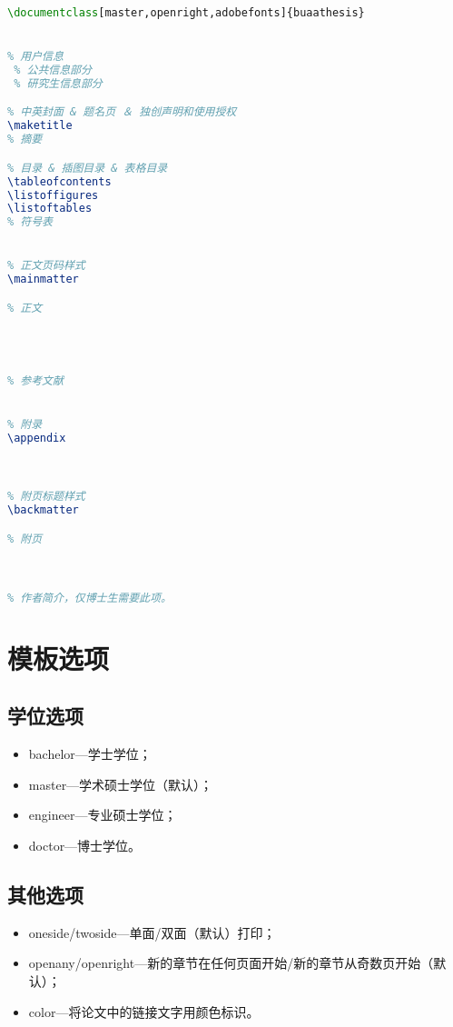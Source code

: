 \begin{lstlisting}[language={LaTeX}]
% !Mode:: "TeX:UTF-8"
\documentclass[master,openright,adobefonts]{buaathesis}


% 用户信息
 % 公共信息部分
 % 研究生信息部分

% 中英封面 & 题名页 ＆ 独创声明和使用授权
\maketitle
% 摘要

% 目录 & 插图目录 & 表格目录
\tableofcontents
\listoffigures
\listoftables
% 符号表


% 正文页码样式
\mainmatter

% 正文
	



% 参考文献


% 附录
\appendix



% 附页标题样式
\backmatter

% 附页



% 作者简介，仅博士生需要此项。


\end{lstlisting}
    
\section{模板选项}
\subsection{学位选项}
    \begin{itemize}
        \item bachelor---学士学位；
        \item master---学术硕士学位（默认）；
        \item engineer---专业硕士学位；
        \item doctor---博士学位。
    \end{itemize}

\subsection{其他选项}
    \begin{itemize}
        \item oneside\slash twoside---单面\slash 双面（默认）打印；
        \item openany\slash openright---新的章节在任何页面开始\slash 新的章节从奇数页开始（默认）；
        \item color---将论文中的链接文字用颜色标识。
    \end{itemize}

